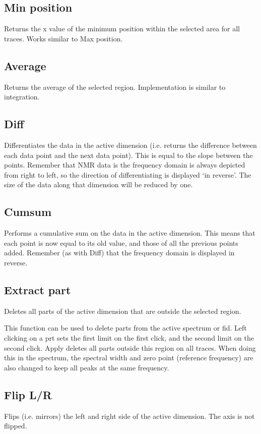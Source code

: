 \documentclass[11pt,a4paper]{article}
\begin{document}
\subsection{Min position}
Returns the x value of the minimum position within the selected area for all traces.
Works similar to Max position.

\subsection{Average}
Returns the average of the selected region. Implementation is similar to integration.

\subsection{Diff}
Differentiates the data in the active dimension (i.e. returns the difference between each data point and the next data point).
This is equal to the slope between the points.
Remember that NMR data is the frequency domain is always depicted from right to left, so the direction of differentiating is displayed `in reverse'.
The size of the data along that dimension will be reduced by one.

\subsection{Cumsum}
Performs a cumulative sum on the data in the active dimension.
This means that each point is now equal to its old value, and those of all the previous points added.
Remember (as with Diff) that the frequency domain is displayed in reverse.


\subsection{Extract part}
Deletes all parts of the active dimension that are outside the selected region.

This function can be used to delete parts from the active spectrum or fid.
Left clicking on a prt sets the first limit on the first click, and the second limit on the second click.
Apply deletes all parts outside this region on all traces.
When doing this in the spectrum, the spectral width and zero point (reference frequency) are also changed to keep all peaks at the same frequency.

\subsection{Flip L/R}
Flips (i.e. mirrors) the left and right side of the active dimension.
The axis is not flipped.
\end{document}
